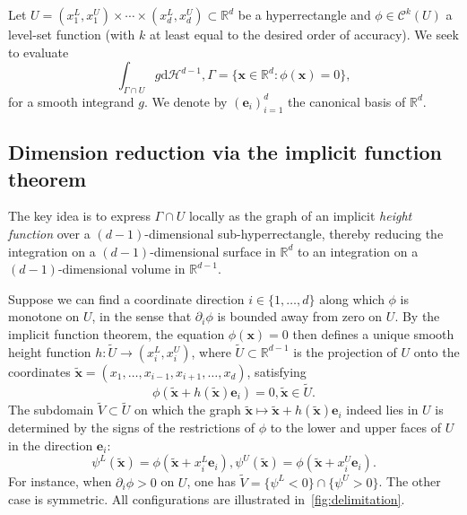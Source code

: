 \documentclass[11pt]{article}
\numberwithin{equation}{section}
\begin{document}
Let \(U = (x_1^L, x_1^U) \times \cdots \times (x_d^L, x_d^U) \subset \mathbb{R}^d\) be a
hyperrectangle and \(\phi \in \mathcal{C}^k(U)\) a level-set function (with \(k\) at least
equal to the desired order of accuracy). We seek to evaluate
\begin{equation}
    \int_{\Gamma \cap U} g \mathrm{d}\mathcal{H}^{d-1},
    \Gamma = \{\mathbf{x} \in \mathbb{R}^d : \phi(\mathbf{x}) = 0\},
\end{equation}
for a smooth integrand \(g\). We denote by \((\mathbf{e}_i)_{i=1}^d\) the canonical basis
of \(\mathbb{R}^d\).

\subsection{Dimension reduction via the implicit function theorem}

The key idea is to express \(\Gamma \cap U\) locally as the graph of an implicit
\emph{height function} over a \((d-1)\)-dimensional sub-hyperrectangle, thereby reducing
the integration on a \((d-1)\)-dimensional surface in \(\mathbb{R}^d\) to an integration
on a \((d-1)\)-dimensional volume in \(\mathbb{R}^{d-1}\).

Suppose we can find a coordinate direction \(i \in \{1,\dots,d\}\) along which \(\phi\) is
monotone on \(U\), in the sense that \(\partial_i \phi\) is bounded away from zero on
\(U\). By the implicit function theorem, the equation \(\phi(\mathbf{x}) = 0\) then
defines a unique smooth height function \(h : \tilde{U} \to (x_i^L, x_i^U)\), where
\(\tilde U \subset \mathbb{R}^{d-1}\) is the projection of \(U\) onto the coordinates
\(\tilde{\mathbf{x}} = (x_1, \dots, x_{i-1}, x_{i+1}, \dots, x_d)\), satisfying
\begin{equation}
    \phi\left(\tilde{\mathbf{x}} + h(\tilde{\mathbf{x}})\mathbf{e}_i\right) = 0,
    \tilde{\mathbf{x}} \in \tilde U.
    \label{eq:height}
\end{equation}
The subdomain \(\tilde V \subset \tilde U\) on which the graph \(\tilde{\mathbf{x}}
\mapsto \tilde{\mathbf{x}} + h(\tilde{\mathbf{x}})\mathbf{e}_i\) indeed lies in \(U\) is
determined by the signs of the restrictions of \(\phi\) to the lower and upper faces of
\(U\) in the direction \(\mathbf{e}_i\):
\begin{equation}
    \psi^L(\tilde{\mathbf{x}}) = \phi(\tilde{\mathbf{x}} + x_i^L \mathbf{e}_i),
    \psi^U(\tilde{\mathbf{x}}) = \phi(\tilde{\mathbf{x}} + x_i^U \mathbf{e}_i).
\end{equation}
For instance, when \(\partial_i \phi > 0\) on \(U\), one has \(\tilde V = \{\psi^L < 0\}
\cap \{\psi^U > 0\}\). The other case is symmetric. All configurations are illustrated
in~\autoref{fig:delimitation}.
\end{document}
